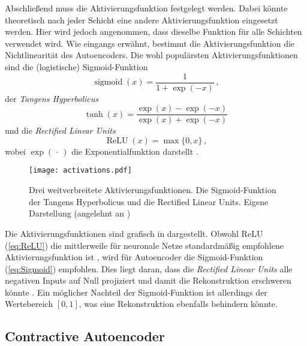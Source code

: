Abschließend muss die Aktivierungsfunktion festgelegt werden. Dabei könnte theoretisch nach jeder
Schicht eine andere Aktivierungsfunktion eingesetzt werden. Hier wird jedoch angenommen, dass
dieselbe Funktion für alle Schichten verwendet wird. Wie eingangs erwähnt, bestimmt die
Aktivierungsfunktion die Nichtlinearität des Autoencoders. Die wohl populärsten
Aktivierungsfunktionen sind die (logistische) Sigmoid-Funktion
\begin{equation}
	\label{eq:Sigmoid}
	\operatorname{sigmoid}(x) = \frac{1}{1 + \exp (-x)} \, ,
\end{equation}
der \textit{Tangens Hyperbolicus}
\begin{equation}
	\label{eq:tanh}
	\operatorname{tanh}(x) = \frac{\exp(x) - \exp(-x)}{\exp(x) + \exp(-x)}
\end{equation}
und die \textit{Rectified Linear Units}
\begin{equation}
	\label{eq:ReLU}
	\operatorname{ReLU}(x) = \max\{0, x\} \, ,
\end{equation}
wobei $\exp(\, \cdot \,)$ die Exponentialfunktion darstellt \parencites[191 -- 195]{Goodfellow.2016}[4]{Charte.2018}.
\begin{figure}[h]
	\centering
	\texttt{[image: activations.pdf]}
	\caption[Drei weitverbreitete Aktivierungsfunktionen.]{Drei weitverbreitete Aktivierungsfunktionen. \captiona Die Sigmoid-Funktion \captionb der Tangens Hyperbolicus und \captionc die Rectified Linear Units. Eigene Darstellung (angelehnt an \textcite[4]{Charte.2018})}
	\label{fig:activations}
\end{figure}
Die Aktivierungsfunktionen sind grafisch in  dargestellt.
Obwohl ReLU (\eqref{eq:ReLU}) die mittlerweile für neuronale Netze standardmäßig empfohlene Aktivierungsfunktion ist \parencite[195]{Goodfellow.2016}, wird für Autoencoder die Sigmoid-Funktion (\eqref{eq:Sigmoid})
empfohlen. Dies liegt daran, dass die \textit{Rectified Linear Units} alle negativen Inputs auf
Null projiziert und damit die Rekonstruktion erschweren könnte \parencite[4]{Charte.2018}. Ein möglicher Nachteil der Sigmoid-Funktion ist allerdings der Wertebereich
$[0, 1]$, was eine Rekonstruktion ebenfalls behindern könnte.
\subsection{Contractive Autoencoder}
\label{ch:MethodenDerDimRed:ML:CAE}

